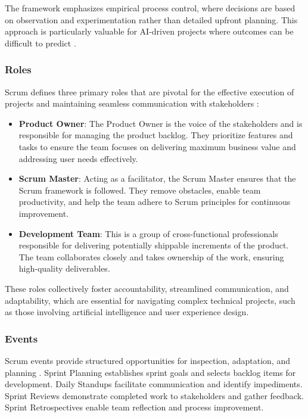 The framework emphasizes empirical process control, where decisions are based on observation and experimentation rather than detailed upfront planning. This approach is particularly valuable for AI-driven projects where outcomes can be difficult to predict \cite{empirical_scrum}.

\subsubsection{Roles}

Scrum defines three primary roles that are pivotal for the effective execution of projects and maintaining seamless communication with stakeholders \cite{scrum_roles}:

\begin{itemize}
    \item \textbf{Product Owner}: The Product Owner is the voice of the stakeholders and is responsible for managing the product backlog. They prioritize features and tasks to ensure the team focuses on delivering maximum business value and addressing user needs effectively.
    \item \textbf{Scrum Master}: Acting as a facilitator, the Scrum Master ensures that the Scrum framework is followed. They remove obstacles, enable team productivity, and help the team adhere to Scrum principles for continuous improvement.
    \item \textbf{Development Team}: This is a group of cross-functional professionals responsible for delivering potentially shippable increments of the product. The team collaborates closely and takes ownership of the work, ensuring high-quality deliverables.
\end{itemize}

These roles collectively foster accountability, streamlined communication, and adaptability, which are essential for navigating complex technical projects, such as those involving artificial intelligence and user experience design.

\subsubsection{Events}

Scrum events provide structured opportunities for inspection, adaptation, and planning \cite{scrum_events}. Sprint Planning establishes sprint goals and selects backlog items for development. Daily Standups facilitate communication and identify impediments. Sprint Reviews demonstrate completed work to stakeholders and gather feedback. Sprint Retrospectives enable team reflection and process improvement.

